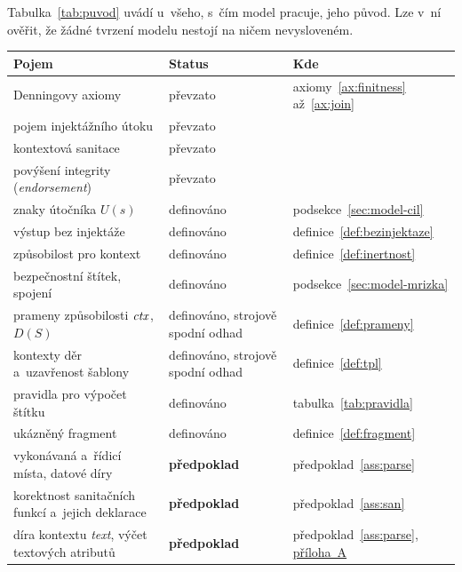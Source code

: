 Tabulka~\ref{tab:puvod} uvádí u~všeho, s~čím model pracuje, jeho původ. Lze v~ní ověřit, že žádné tvrzení modelu nestojí na ničem nevysloveném.

\begin{table}[htbp]
    \centering
    \footnotesize
    \setlength{\tabcolsep}{4pt}
    \begin{tabularx}{\textwidth}{@{}YlY@{}}
        \toprule
        \textbf{Pojem} & \textbf{Status} & \textbf{Kde} \\
        \midrule
        Denningovy axiomy                & převzato & axiomy~\ref{ax:finitness} až~\ref{ax:join} \\
        pojem injektážního útoku         & převzato & \textcite{su2006essence} \\
        kontextová sanitace              & převzato & \textcite{samuel2011context} \\
        povýšení integrity (\emph{endorsement}) & převzato & \textcite{zdancewic2003robust} \\
        \midrule
        znaky útočníka $U(s)$            & definováno & podsekce~\ref{sec:model-cil} \\
        výstup bez injektáže             & definováno & definice~\ref{def:bezinjektaze} \\
        způsobilost pro kontext          & definováno & definice~\ref{def:inertnost} \\
        bezpečnostní štítek, spojení     & definováno & podsekce~\ref{sec:model-mrizka} \\
        prameny způsobilosti $\mathit{ctx}$, $D(S)$ & definováno, strojově spodní odhad & definice~\ref{def:prameny} \\
        kontexty děr a~uzavřenost šablony & definováno, strojově spodní odhad & definice~\ref{def:tpl} \\
        pravidla pro výpočet štítku      & definováno & tabulka~\ref{tab:pravidla} \\
        ukázněný fragment                & definováno & definice~\ref{def:fragment} \\
        \midrule
        vykonávaná a~řídicí místa, datové díry & \textbf{předpoklad} & předpoklad~\ref{ass:parse} \\
        korektnost sanitačních funkcí a~jejich deklarace & \textbf{předpoklad} & předpoklad~\ref{ass:san} \\
        díra kontextu \emph{text}, výčet textových atributů & \textbf{předpoklad} & předpoklad~\ref{ass:parse}, \hyperref[app:own-work]{příloha~A} \\

\end{tabularx}
\end{table}
